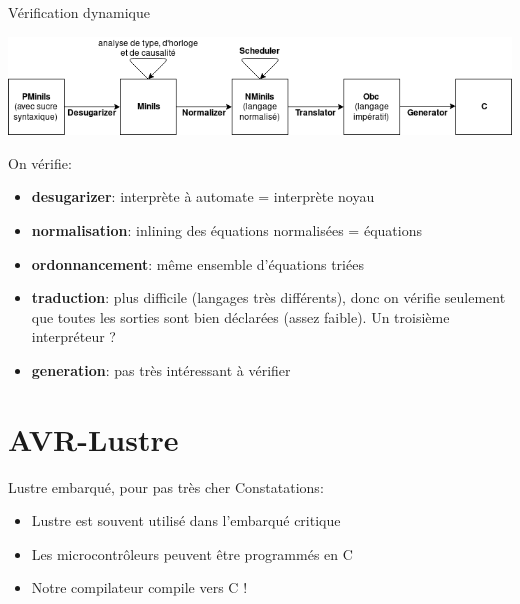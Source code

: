 \documentclass[xcolor={svgnames}]{beamer}
\begin{document}
\begin{frame}{Vérification dynamique}
  \begin{center}
    \includegraphics[width=.8\paperwidth]{assets/chain.png}
  \end{center}
  On vérifie:
  \begin{itemize}
    \item \textbf{desugarizer}: interprète à automate = interprète noyau
    \item \textbf{normalisation}: inlining des équations normalisées = équations
    \item \textbf{ordonnancement}: même ensemble d'équations triées
    \item \textbf{traduction}: plus difficile (langages très différents), donc on vérifie seulement que toutes les sorties sont bien déclarées (assez faible). Un troisième interpréteur ?
    \item \textbf{generation}: pas très intéressant à vérifier
  \end{itemize}
\end{frame}

\section{AVR-Lustre}

\begin{frame}{Lustre embarqué, pour pas très cher}
  Constatations:
  \begin{itemize}
    \item Lustre est souvent utilisé dans l'embarqué critique
    \item Les microcontrôleurs peuvent être programmés en C
    \item Notre compilateur compile vers C !
  \end{itemize}
\end{frame}
\end{document}
